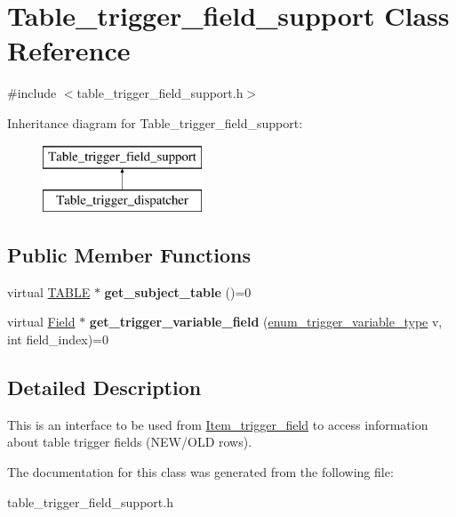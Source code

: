 \hypertarget{classTable__trigger__field__support}{}\section{Table\+\_\+trigger\+\_\+field\+\_\+support Class Reference}
\label{classTable__trigger__field__support}


{\ttfamily \#include $<$table\+\_\+trigger\+\_\+field\+\_\+support.\+h$>$}

Inheritance diagram for Table\+\_\+trigger\+\_\+field\+\_\+support\+:\begin{figure}[H]
\begin{center}
\leavevmode
\includegraphics[height=2.000000cm]{classTable__trigger__field__support}
\end{center}
\end{figure}
\subsection*{Public Member Functions}
\begin{DoxyCompactItemize}
\item 
\mbox{\label{classTable__trigger__field__support_a2e884d864e5684d1d3618e777d1b19d0}} 
virtual \mbox{\hyperlink{structTABLE}{T\+A\+B\+LE}} $\ast$ {\bfseries get\+\_\+subject\+\_\+table} ()=0
\item 
\mbox{\label{classTable__trigger__field__support_a18aad6d14e882a6278d384157e0e1fbc}} 
virtual \mbox{\hyperlink{classField}{Field}} $\ast$ {\bfseries get\+\_\+trigger\+\_\+variable\+\_\+field} (\mbox{\hyperlink{trigger__def_8h_a21eb81babac229407b0b483596163bc2}{enum\+\_\+trigger\+\_\+variable\+\_\+type}} v, int field\+\_\+index)=0
\end{DoxyCompactItemize}


\subsection{Detailed Description}
This is an interface to be used from \mbox{\hyperlink{classItem__trigger__field}{Item\+\_\+trigger\+\_\+field}} to access information about table trigger fields (N\+E\+W/\+O\+LD rows). 

The documentation for this class was generated from the following file\+:\begin{DoxyCompactItemize}
\item 
table\+\_\+trigger\+\_\+field\+\_\+support.\+h\end{DoxyCompactItemize}
